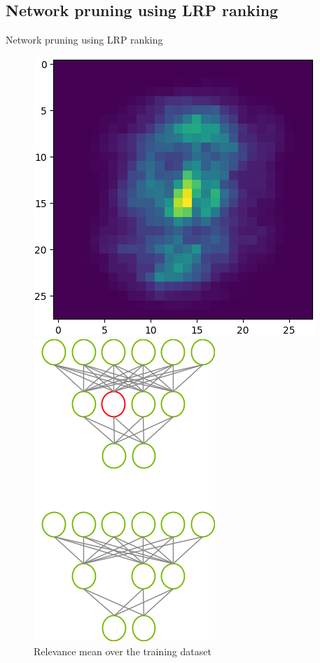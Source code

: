 \documentclass[aspectratio=169]{beamer}
\theoremstyle{definition}
\begin{document}
\subsection{Network pruning using LRP ranking}
\begin{frame}{Network pruning using LRP ranking}
    \begin{figure}[ht]
        \begin{minipage}[c]{0.55\linewidth}
            \centering
            \includegraphics[width=.6\textwidth]{relevance-mean.png}
            \caption{Relevance mean over the training dataset}
        \end{minipage}
        \hspace{0.5cm}
        \begin{minipage}[c]{0.35\linewidth}
            \centering
            \includegraphics[width=.7\textwidth]{pruning.png}
        \end{minipage}
    \end{figure}
\end{frame}
\end{document}
